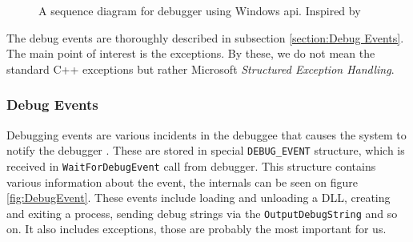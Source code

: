 \begin{figure}
    \centering
    \caption{A sequence diagram for debugger using Windows api. Inspired by }
    \label{fig:win32debugger}
\end{figure}

The debug events are thoroughly described in subsection \ref{section:Debug Events}. The main point of interest is the exceptions.
By these, we do not mean the standard C++ exceptions but rather Microsoft \textit{Structured Exception Handling}.

\subsubsection*{Debug Events}\label{section:Debug Events}
Debugging events are various incidents in the debuggee that causes the system
to notify the debugger \cite{windows-msdn-debug-events}. These are stored in
special \texttt{DEBUG_EVENT} structure, which is received in
\texttt{WaitForDebugEvent} call from debugger. This structure contains various
information about the event, the internals can be seen on figure
\ref{fig:DebugEvent}. These events include loading and unloading a DLL,
creating and exiting a process, sending debug strings via the
\texttt{OutputDebugString} and so on. It also includes exceptions, those
are probably the most important for us. 

